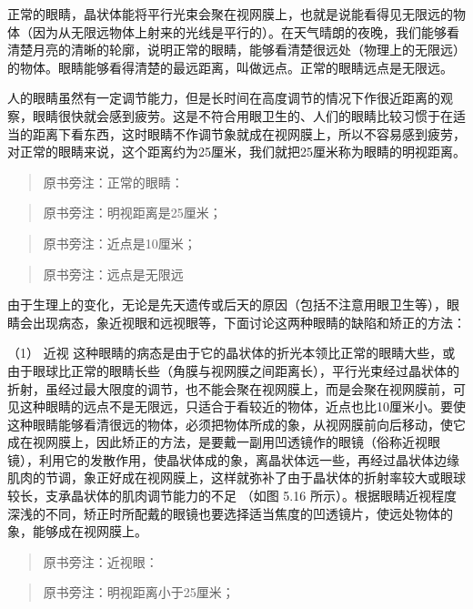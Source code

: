 正常的眼睛，晶状体能将平行光束会聚在视网膜上，也就是说能看得见无限远的物体（因为从无限远物体上射来的光线是平行的）。在天气晴朗的夜晚，我们能够看清楚月亮的清晰的轮廓，说明正常的眼睛，能够看清楚很远处（物理上的无限远）的物体。眼睛能够看得清楚的最远距离，叫做远点。正常的眼睛远点是无限远。

人的眼睛虽然有一定调节能力，但是长时间在高度调节的情况下作很近距离的观察，眼睛很快就会感到疲劳。这是不符合用眼卫生的、人们的眼睛比较习惯于在适当的距离下看东西，这时眼睛不作调节象就成在视网膜上，所以不容易感到疲劳，对正常的眼睛来说，这个距离约为25厘米，我们就把25厘米称为眼睛的明视距离。

\begin{quote}
原书旁注：正常的眼睛：
\end{quote}

\begin{quote}
原书旁注：明视距离是25厘米；
\end{quote}

\begin{quote}
原书旁注：近点是10厘米；
\end{quote}

\begin{quote}
原书旁注：远点是无限远
\end{quote}

由于生理上的变化，无论是先天遗传或后天的原因（包括不注意用眼卫生等），眼睛会出现病态，象近视眼和远视眼等，下面讨论这两种眼睛的缺陷和矫正的方法：

（1） 近视
这种眼睛的病态是由于它的晶状体的折光本领比正常的眼睛大些，或由于眼球比正常的眼睛长些（角膜与视网膜之间距离长），平行光束经过晶状体的折射，虽经过最大限度的调节，也不能会聚在视网膜上，而是会聚在视网膜前，可见这种眼睛的远点不是无限远，只适合于看较近的物体，近点也比10厘米小。要使这种眼睛能够看清很远的物体，必须把物体所成的象，从视网膜前向后移动，使它成在视网膜上，因此矫正的方法，是要戴一副用凹透镜作的眼镜（俗称近视眼镜），利用它的发散作用，使晶状体成的象，离晶状体远一些，再经过晶状体边缘肌肉的节调，象正好成在视网膜上，这样就弥补了由于晶状体的折射率较大或眼球较长，支承晶状体的肌肉调节能力的不足
（如图 5.16
所示）。根据眼睛近视程度深浅的不同，矫正时所配戴的眼镜也要选择适当焦度的凹透镜片，使远处物体的象，能够成在视网膜上。

\begin{quote}
原书旁注：近视眼：
\end{quote}

\begin{quote}
原书旁注：明视距离小于25厘米；
\end{quote}

